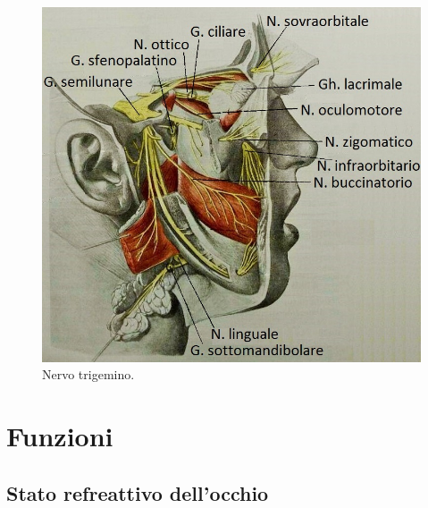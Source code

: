 \begin{figure}[h!]
	\centering
	\includegraphics[scale=0.7]{source/immagini/nervo_trigemino.jpg}
	\caption[Nervo trigemino]{Nervo trigemino.}
	\label{fig:test11}
\end{figure}

\section{Funzioni}

\subsection{Stato refreattivo dell'occhio}


